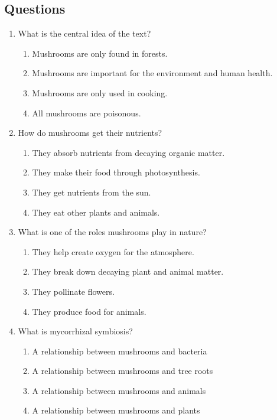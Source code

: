 \documentclass[12pt]{article}
\begin{document}

\subsection*{Questions}

\begin{enumerate}

    \item What is the central idea of the text?
    \begin{enumerate}[label=\Alph*.]
        \item Mushrooms are only found in forests.
        \item Mushrooms are important for the environment and human health.
        \item Mushrooms are only used in cooking.
        \item All mushrooms are poisonous.
    \end{enumerate}
    \vspace{0.5cm}

    \item How do mushrooms get their nutrients?
    \begin{enumerate}[label=\Alph*.]
        \item They absorb nutrients from decaying organic matter.
        \item They make their food through photosynthesis.
        \item They get nutrients from the sun.
        \item They eat other plants and animals.
    \end{enumerate}
    \vspace{0.5cm}

    \item What is one of the roles mushrooms play in nature?
    \begin{enumerate}[label=\Alph*.]
        \item They help create oxygen for the atmosphere.
        \item They break down decaying plant and animal matter.
        \item They pollinate flowers.
        \item They produce food for animals.
    \end{enumerate}
    \vspace{0.5cm}

    \item What is mycorrhizal symbiosis?
    \begin{enumerate}[label=\Alph*.]
        \item A relationship between mushrooms and bacteria
        \item A relationship between mushrooms and tree roots
        \item A relationship between mushrooms and animals
        \item A relationship between mushrooms and plants
    \end{enumerate}
    \vspace{0.5cm}


\end{enumerate}
\end{document}

